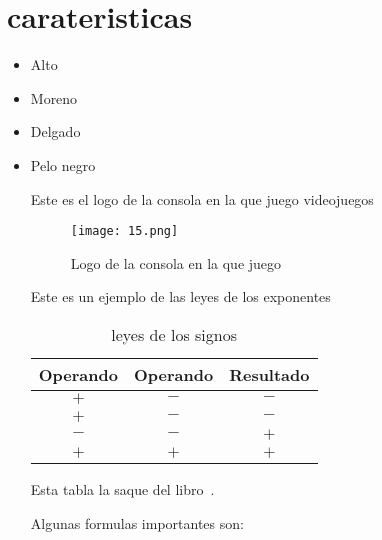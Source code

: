 \section{ carateristicas}
\begin{itemize}
\item    Alto
\item   Moreno
\item   Delgado
  \item  Pelo negro

  Este es el logo de la consola en la que juego videojuegos\\
  
  \begin{figure}[h]
  \centering
  \texttt{[image: 15.png]}
  \caption{Logo de la consola en la que juego}
  \label{fig:Logo de xbox}
  \end{figure}



    
\begin{table}[h]
   Este es un ejemplo de las leyes de los exponentes\\
  \centering
  \begin{tabular}{| c | c | c | }
    \hline
    Operando & Operando & Resultado\\\hline
    $+$ & $-$ & $-$\\\hline
    $+$ & $-$ & $-$\\\hline
    $-$ & $-$ & $+$\\\hline
    $+$ & $+$ & $+$\\\hline
  \end{tabular}
  \caption{leyes de los signos}
  \label{tabla :leyes de los signos}
  \end{table}
Esta tabla la saque del libro~\cite{Floodlight}.




\newpage
Algunas formulas  importantes son:
\end{itemize}
